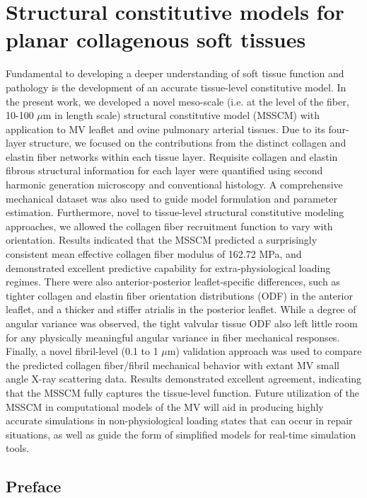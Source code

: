 \chapter{Structural constitutive models for planar collagenous soft tissues}

    Fundamental to developing a deeper understanding of soft tissue function and pathology is the development of an accurate tissue-level constitutive model. In the present work, we developed a novel meso-scale (i.e. at the level of the fiber, 10-100 $\mu$m in length scale) structural constitutive model (MSSCM) with application to MV leaflet and ovine pulmonary arterial tissues. Due to its four-layer structure, we focused on the contributions from the distinct collagen and elastin fiber networks within each tissue layer. Requisite collagen and elastin fibrous structural information for each layer were quantified using second harmonic generation microscopy and conventional histology. A comprehensive mechanical dataset was also used to guide model formulation and parameter estimation. Furthermore, novel to tissue-level structural constitutive modeling approaches, we allowed the collagen fiber recruitment function to vary with orientation. Results indicated that the MSSCM predicted a surprisingly consistent mean effective collagen fiber modulus of 162.72 MPa, and demonstrated excellent predictive capability for extra-physiological loading regimes. There were also anterior-posterior leaflet-specific differences, such as tighter collagen and elastin fiber orientation distributions (ODF) in the anterior leaflet, and a thicker and stiffer atrialis in the posterior leaflet. While a degree of angular variance was observed, the tight valvular tissue ODF also left little room for any physically meaningful angular variance in fiber mechanical responses. Finally, a novel fibril-level (0.1 to 1 $\mu$m) validation approach was used to compare the predicted collagen fiber/fibril mechanical behavior with extant MV small angle X-ray scattering data. Results demonstrated excellent agreement, indicating that the MSSCM fully captures the tissue-level function. Future utilization of the MSSCM in computational models of the MV will aid in producing highly accurate simulations in non-physiological loading states that can occur in repair situations, as well as guide the form of simplified models for real-time simulation tools.

\section*{Preface}
%



